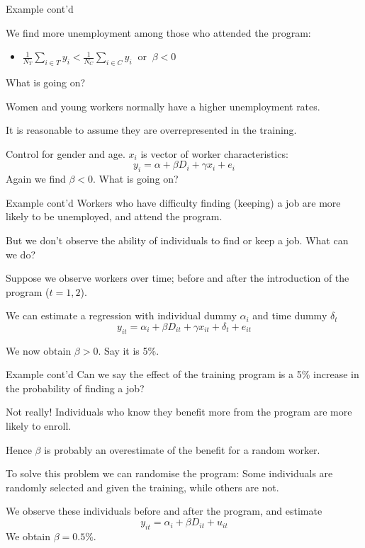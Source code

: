 \documentclass[handout]{beamer}
\begin{document}
\begin{frame}{Example cont'd}


We find more unemployment among those who attended the program: \begin{itemize}
\item $\frac{1}{N_T}\sum_{i\in T}y_i< \frac{1}{N_C}\sum_{i\in C}y_i \ $   or   $\ \beta< 0$ 
\end{itemize}\medskip

What is going on?\medskip

\pause

Women and young workers normally have a higher unemployment rates.\medskip

It is reasonable to assume they are overrepresented in the training.  \medskip
\pause

Control for gender and age. $x_i$ is vector of worker characteristics:
\begin{equation}\label{e2}
y_i=\alpha+\beta D_i+\gamma x_i+ e_i
\end{equation}
Again we find $\beta<0$. What is going on?
\end{frame}



\begin{frame}{Example cont'd}
Workers who have difficulty finding (keeping) a job are more likely to be unemployed, and attend the program.
\medskip

But we don't observe the ability of individuals to find or keep a job.  
What can we do?
\pause\medskip

Suppose we observe workers over time; before and after the introduction of the program ($t=1,2$).\medskip


We can estimate a regression with individual dummy $\alpha_i$ and time dummy $\delta_t$
\begin{equation}\label{e3}
y_{it}=\alpha_i+\beta D_{it} +\gamma x_{it} +\delta_t+e_{it} \end{equation}

We now obtain $\beta>0$.  Say it is 5\%.
\end{frame}

\begin{frame}{Example cont'd}
Can we say the effect of the training program is a 5\% increase in the probability of finding a job?
\pause
\medskip

Not really!  
Individuals who know they benefit more from the program are more likely to enroll.\medskip


Hence $\beta$ is probably an overestimate of the benefit for a random worker.
\pause\medskip

To solve this problem we can randomise the program:  Some individuals are randomly selected and given the training, while others are not.  \medskip

We observe these individuals before and after the program, and estimate\begin{equation}\label{e4}
y_{it}=\alpha_i+\beta D_{it} +u_{it}
\end{equation}
We obtain $\beta=0.5\%$.
\end{frame}
\end{document}
